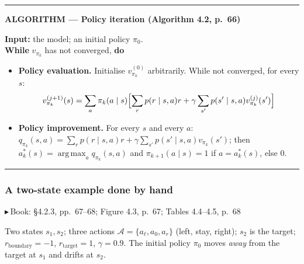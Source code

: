 \documentclass[11pt, letterpaper]{article}
\theoremstyle{runin}
\theoremstyle{runinplain}
\theoremstyle{remark}
\newcommand{\Aspace}{\mathcal{A}}
\newcommand{\argmax}{\operatorname*{arg\,max}}
\newcommand{\bk}[1]{{\color{bookblue}\small$\blacktriangleright$\,\textsf{Book: #1}}}
\newenvironment{algobox}[1]
  {\par\medskip\noindent\rule{\textwidth}{0.9pt}\par\nobreak\vspace{0.25em}
   \noindent\textbf{\small ALGORITHM --- #1}\par\nobreak\vspace{0.15em}
   \small}
  {\par\nobreak\vspace{0.25em}\noindent\rule{\textwidth}{0.9pt}\par\medskip}
\begin{document}
\begin{algobox}{Policy iteration (Algorithm 4.2, p.~66)}
\textbf{Input:} the model; an initial policy $\pi_0$.\\
\textbf{While} $v_{\pi_k}$ has not converged, \textbf{do}
\begin{itemize}\itemsep0pt
  \item \textbf{Policy evaluation.} Initialise $v^{(0)}_{\pi_k}$ arbitrarily.
        While not converged, for every $s$:
        \[
          v_{\pi_k}^{(j+1)}(s)=\sum_a\pi_k(a\mid s)
            \Bigl[\sum_r p(r\mid s,a)r+\gamma\sum_{s'}p(s'\mid s,a)v^{(j)}_{\pi_k}(s')\Bigr]
        \]
  \item \textbf{Policy improvement.} For every $s$ and every $a$:
        $q_{\pi_k}(s,a)=\sum_r p(r\mid s,a)r+\gamma\sum_{s'}p(s'\mid s,a)v_{\pi_k}(s')$;
        then $a_k^*(s)=\argmax_a q_{\pi_k}(s,a)$ and
        $\pi_{k+1}(a\mid s)=1$ if $a=a_k^*(s)$, else $0$.
\end{itemize}
\end{algobox}

\subsubsection{A two-state example done by hand}

\bk{\S4.2.3, pp.~67--68; Figure 4.3, p.~67; Tables 4.4--4.5, p.~68}

Two states $s_1,s_2$; three actions $\Aspace=\{a_\ell,a_0,a_r\}$ (left, stay,
right); $s_2$ is the target; $r_{\text{boundary}}=-1$, $r_{\text{target}}=1$,
$\gamma=0.9$. The initial policy $\pi_0$ moves \emph{away} from the target at $s_1$
and drifts at $s_2$.
\end{document}
